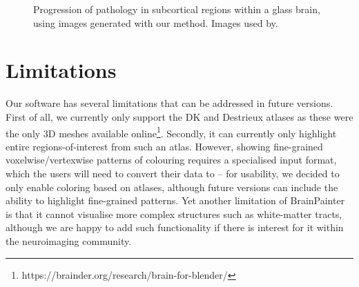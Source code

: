 \documentclass[final,times,twocolumn,authoryear]{elsarticle}
\begin{document}
\begin{figure}[htp]
\centering

 \caption{Progression of pathology in subcortical regions within a glass brain, using images generated with our method. Images used by\cite{wijeratne2018image}.}
   \label{fig:peter}
\end{figure}

\section{Limitations}

Our software has several limitations that can be addressed in future versions. First of all, we currently only support the DK and Destrieux atlases as these were the only 3D meshes available online\footnote{https://brainder.org/research/brain-for-blender/}. Secondly, it can currently only highlight entire regions-of-interest from such an atlas. However, showing fine-grained voxelwise/vertexwise patterns of colouring requires a specialised input format, which the users will need to convert their data to -- for usability, we decided to only enable coloring based on atlases, although future versions can include the ability to highlight fine-grained patterns. Yet another limitation of BrainPainter is that it cannot visualise more complex structures such as white-matter tracts, although we are happy to add such functionality if there is interest for it within the neuroimaging community.
\end{document}
